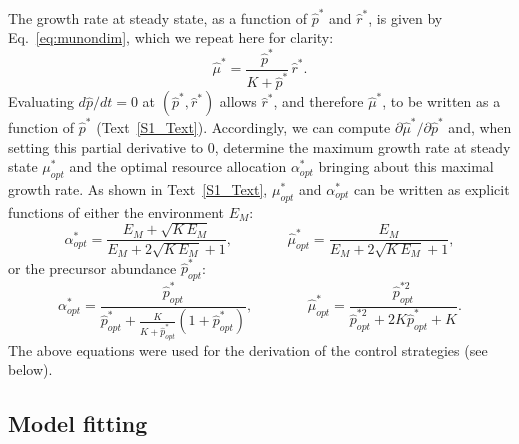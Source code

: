 \documentclass[10pt,letterpaper]{article}
\begin{document}
{The growth rate at steady state, as a function of $\hat{p}^*$ and $\hat{r}^*$, is given by Eq.~\ref{eq:munondim}, which we repeat here for clarity:
\begin{equation*}
\hat{\mu}^* = \frac{\hat{p}^*}{K + \hat{p}^*} \, \hat{r}^* .
\end{equation*}
Evaluating $d\hat{p}/dt=0$ at $(\hat{p}^*, \hat{r}^*)$ allows $\hat{r}^*$, and therefore $\hat{\mu}^*$, to be written as a function of $\hat{p}^*$ (Text~\ref{S1_Text}).
Accordingly, we can compute $\partial\hat{\mu}^*/\partial\hat{p}^*$ and, when setting this partial derivative to 0, determine the maximum growth rate at steady state $\mu_{opt}^*$ and the optimal resource allocation $\alpha_{opt}^*$ bringing about this maximal growth rate.
As shown in Text~\ref{S1_Text}, $\mu_{opt}^*$ and $\alpha_{opt}^*$ can be written as explicit functions of either the environment $E_M$:
\begin{equation}
\label{eq:alpha_mu_optimal}
\alpha_{opt}^* = \frac{E_M + \sqrt{K\, E_M}}{E_M + 2\sqrt{K\, E_M} + 1}
, \;\;\;\;\;\;\;\;\;\;\;\;\;\; 
\hat{\mu}^*_{opt} = \frac{E_M}{E_M + 2\sqrt{K\, E_M} + 1},
\end{equation}
or the precursor abundance $\hat{p}_{opt}^*$:
\begin{equation}
\label{eq:alpha_mu_optimal_p}
\alpha_{opt}^* = \frac{\hat{p}^{*}_{opt}}{\hat{p}^{*}_{opt} + \frac{K}{K+\hat{p}^{*}_{opt}}(1+\hat{p}^{*}_{opt})}
, \;\;\;\;\;\;\;\;\;\;\;\;\;\; 
\hat{\mu}^*_{opt} = \frac{\hat{p}^{* 2}_{opt}}{\hat{p}^{* 2}_{opt} + 2K\hat{p}^*_{opt} + K}.
\end{equation}
The above equations were used for the derivation of the control strategies (see below).


\subsection*{Model fitting}
\label{sec:methods_model_fitting}

}
\end{document}
